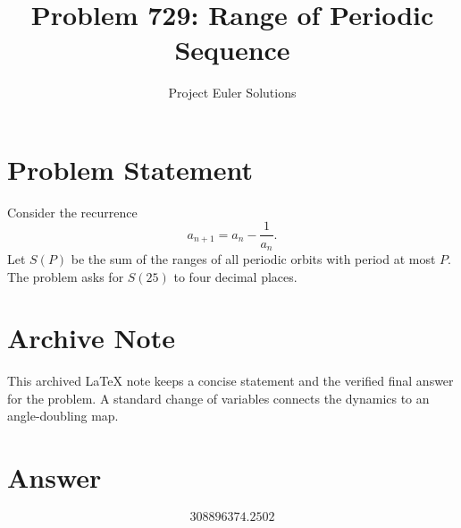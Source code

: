 \documentclass[11pt]{article}
\title{Problem 729: Range of Periodic Sequence}
\author{Project Euler Solutions}
\date{}
\begin{document}
\maketitle

\section{Problem Statement}
Consider the recurrence
\[
a_{n+1}=a_n-\frac{1}{a_n}.
\]
Let $S(P)$ be the sum of the ranges of all periodic orbits with period at most $P$. The problem asks for $S(25)$ to four decimal places.

\section{Archive Note}
This archived LaTeX note keeps a concise statement and the verified final answer for the problem. A standard change of variables connects the dynamics to an angle-doubling map.

\section{Answer}

\[
\boxed{308896374.2502}
\]
\end{document}
